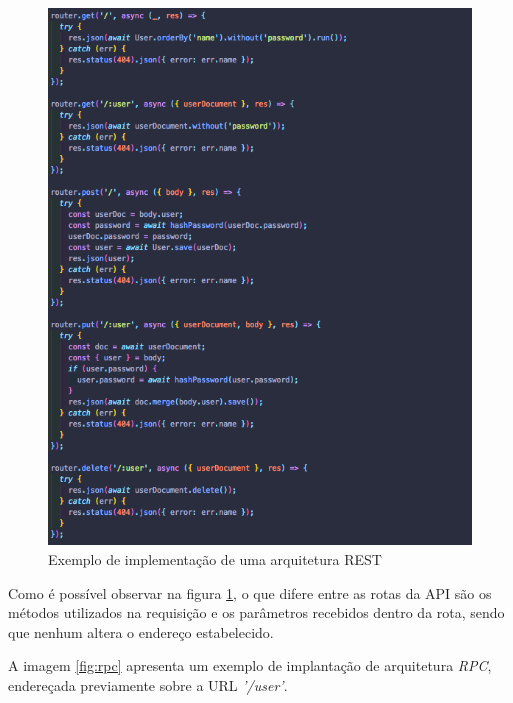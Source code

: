 \begin{figure}[!ht]
	\centering
		\includegraphics[scale=0.6]{figuras/software/rest.png}
	\caption{Exemplo de implementação de uma arquitetura REST}
	\label{fig:rest}
\end{figure}

Como é possível observar na figura \ref{fig:rest}, o que difere entre as rotas da API são os métodos utilizados na requisição e os parâmetros recebidos dentro da rota, sendo que nenhum altera o endereço estabelecido.

A imagem \ref{fig:rpc} apresenta um exemplo de implantação de arquitetura \textit{RPC}, endereçada previamente sobre a URL \textit{'/user'}.

